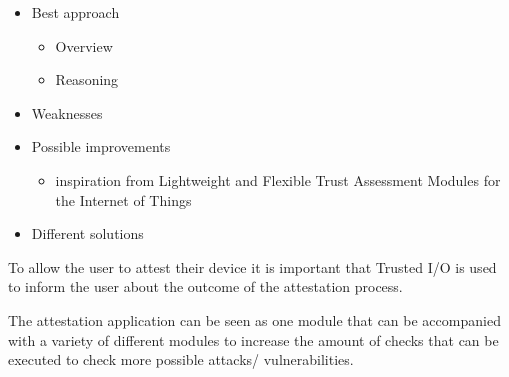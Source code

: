 \documentclass{report}
\begin{document}
\begin{itemize}
\item Best approach \begin{itemize}
\item Overview
\item Reasoning
\end{itemize}
\item Weaknesses
\item Possible improvements \begin{itemize}
\item inspiration from Lightweight and Flexible Trust Assessment Modules for the Internet of Things
\end{itemize}
\item Different solutions
\end{itemize}

To allow the user to attest their device it is important that Trusted I/O is used to inform the user about the outcome of the attestation process.
\medskip

The attestation application can be seen as one module that can be accompanied with a variety of different modules to increase the amount of checks that can be executed to check more possible attacks/ vulnerabilities.
\end{document}

